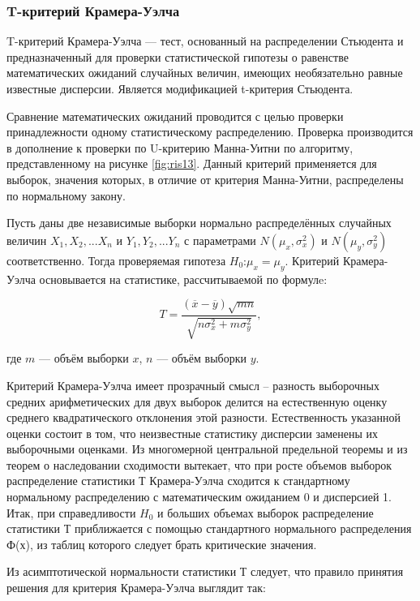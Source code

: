 \subsubsection{T-критерий Крамера-Уэлча}

T-критерий Крамера-Уэлча --- тест, основанный на распределении Стьюдента и предназначенный для проверки статистической гипотезы о равенстве математических ожиданий случайных величин, имеющих необязательно равные известные дисперсии\cite{Orlov}. Является модификацией t-критерия Стьюдента. 

Сравнение математических ожиданий проводится с целью проверки принадлежности одному статистическому распределению. Проверка производится в дополнение к проверки по U-критерию Манна-Уитни по алгоритму, представленному на рисунке \ref{fig:ris13}. Данный критерий применяется для выборок, значения которых, в отличие от критерия Манна-Уитни, распределены по нормальному закону.

Пусть даны две независимые выборки нормально распределённых случайных величин $X_{1}, X_{2}, ... X_{n}$ и $Y_{1}, Y_{2}, ... Y_{n}$ с параметрами $N(\mu_{x},\sigma_{x}^2)$ и $N(\mu_{y},\sigma_{y}^2)$ соответственно. Тогда проверяемая гипотеза $H_{0}$:$\mu_{x}=\mu_{y}$. Критерий Крамера-Уэлча основывается на статистике, рассчитываемой по формулe:

\begin{equation}
	T = \frac{(\overline{x}-\overline{y})\sqrt{mn}}{\sqrt{n\sigma_{x}^2 + m\sigma_{y}^2}},
\end{equation}

где $m$ --- объём выборки $x$, $n$ --- объём выборки $y$.

Критерий Крамера-Уэлча имеет прозрачный смысл – разность выборочных средних
арифметических для двух выборок делится на естественную оценку среднего
квадратического отклонения этой разности. Естественность указанной оценки состоит в том, что неизвестные статистику дисперсии заменены их выборочными оценками. Из многомерной центральной предельной теоремы и из теорем о наследовании сходимости вытекает, что при росте объемов выборок распределение статистики Т Крамера-Уэлча сходится к стандартному нормальному распределению с математическим ожиданием 0 и дисперсией 1. Итак, при справедливости $H_{0}$ и больших объемах выборок распределение статистики Т приближается с помощью стандартного нормального распределения Ф(х), из таблиц которого следует брать критические значения. 

Из асимптотической нормальности статистики Т следует, что
правило принятия решения для критерия Крамера-Уэлча выглядит так: 

